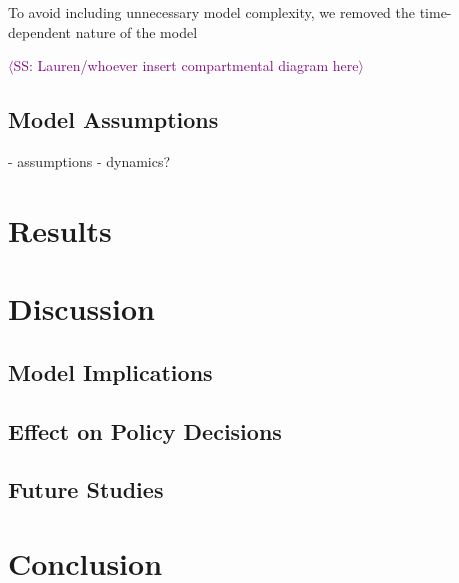 \documentclass[12pt, centerh1]{article}
\newcommand{\sophie}[1]{{\textcolor{purple}{$\langle$SS: #1$\rangle$}}}
\begin{document}
To avoid including unnecessary model complexity, we removed the time-dependent nature of the model 

\sophie{Lauren/whoever insert compartmental diagram here}

\subsection{Model Assumptions}
- assumptions
- dynamics?

\subsection{}


\section{Results}



\section{Discussion}

\subsection{Model Implications}

\subsection{Effect on Policy Decisions}

\subsection{Future Studies}


\section{Conclusion}

\newpage

\end{document}
